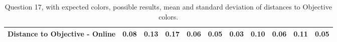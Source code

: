 \begin{table}[H]
{\begin{tabular}{lccccccccccccc}
    \multicolumn{4}{l}{Distance to Objective - Online}                                                                                               & \multicolumn{1}{|c}{0.08}        & \multicolumn{1}{c|}{0.13}    & \multicolumn{1}{|c}{0.17}        & \multicolumn{1}{c|}{0.06}    & \multicolumn{1}{|c}{\textbf{0.05}}       & \multicolumn{1}{c|}{0.03}    & \multicolumn{1}{|c}{0.10}        & \multicolumn{1}{c|}{0.06}    & \multicolumn{1}{|c}{0.11}       & \multicolumn{1}{c|}{0.05}    \\ \hline
    \end{tabular}}
  \caption[Question 17, with expected Results.]{Question 17, with expected colors, possible results, mean and standard deviation of distances to Objective colors.}
  \label{table:lab_q17_expected}
\end{table}
%
%
%
